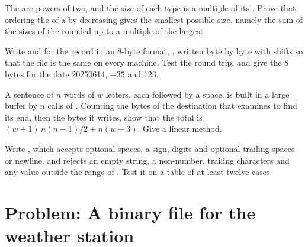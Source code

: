 \begin{exercise}[$\star\star$]\label{exo:b1:c-strings-structs-files:9}
The  are powers of two, and the size of each type is a multiple of its . Prove that ordering the
 of a  by decreasing  gives the smallest possible size, namely the sum of the sizes of the
 rounded up to a multiple of the largest .
\end{exercise}

\begin{exercise}[$\star\star\star$]\label{exo:b1:c-strings-structs-files:10}
Write  and  for the record  in an 8-byte format, , written byte by byte with shifts so that the file is the same on every
machine. Test the round trip, and give the 8 bytes for the date 20250614, $-35$ and 123.
\end{exercise}

\begin{exercise}[$\star\star\star$]\label{exo:b1:c-strings-structs-files:11}
A sentence of $n$ words of $w$ letters, each followed by a space, is built in a large buffer by $n$ calls of
. Counting the bytes of the destination that  examines to find its end, then the bytes it
writes, show that the total is $(w+1)\,n(n-1)/2 + n(w+3)$. Give a linear method.
\end{exercise}

\begin{exercise}[$\star\star\star$]\label{exo:b1:c-strings-structs-files:12}
Write , which accepts optional spaces, a sign, digits and optional
trailing spaces or newline, and rejects an empty string, a non-number, trailing characters and any value outside the
range of . Test it on a table of at least twelve cases.
\end{exercise}

\section{Problem: A binary file for the weather station}\label{sec:b1:c-strings-structs-files:problem}

